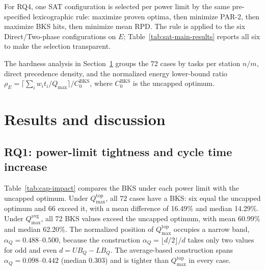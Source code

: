 \documentclass[]{interact}
\theoremstyle{plain}
\theoremstyle{definition}
\theoremstyle{remark}
\newcommand{\Qmax}{Q_{\max}}
\begin{document}
For RQ4, one SAT configuration is selected per power limit by the same pre-specified lexicographic rule: maximize proven optima, then minimize PAR-2, then maximize BKS hits, then minimize mean RPD. The rule is applied to the six Direct/Two-phase configurations on $E$; Table~\ref{tab:sat-main-results} reports all six to make the selection transparent.

The hardness analysis in Section~\ref{sec:results} groups the 72 cases by tasks per station $n/m$, direct precedence density, and the normalized energy lower-bound ratio $\rho_E=\lceil\sum_iw_it_i/\Qmax\rceil/C^{\mathrm{BKS}}_0$, where $C^{\mathrm{BKS}}_0$ is the uncapped optimum.

\section{Results and discussion}
\label{sec:results}



\subsection{RQ1: power-limit tightness and cycle time increase}

Table~\ref{tab:cap-impact} compares the BKS under each power limit with the uncapped optimum. Under $Q_{\max}^{\mathrm{top}}$, all 72 cases have a BKS: six equal the uncapped optimum and 66 exceed it, with a mean difference of 16.49\% and median 14.29\%. Under $Q_{\max}^{\mathrm{avg}}$, all 72 BKS values exceed the uncapped optimum, with mean 60.99\% and median 62.20\%. The normalized position of $Q_{\max}^{\mathrm{top}}$ occupies a narrow band, $\alpha_Q=0.488$--$0.500$, because the construction $\alpha_Q=\lfloor d/2\rfloor/d$ takes only two values for odd and even $d=UB_Q-LB_Q$. The average-based construction spans $\alpha_Q=0.098$--$0.442$ (median 0.303) and is tighter than $Q_{\max}^{\mathrm{top}}$ in every case.
\end{document}
